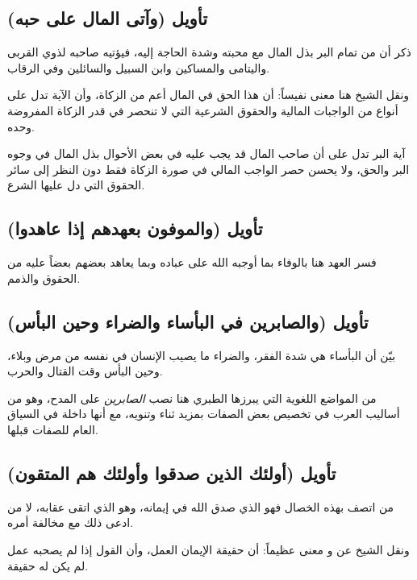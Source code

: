 \subsection{تأويل (وآتى المال على حبه)}
ذكر  أن من تمام البر بذل المال مع محبته وشدة الحاجة إليه، فيؤتيه صاحبه لذوي القربى واليتامى والمساكين وابن السبيل والسائلين وفي الرقاب.

ونقل الشيخ هنا معنى نفيساً: أن هذا الحق في المال أعم من الزكاة، وأن الآية تدل على أنواع من الواجبات المالية والحقوق الشرعية التي لا تنحصر في قدر الزكاة المفروضة وحده.

\begin{fawaid}
آية البر تدل على أن صاحب المال قد يجب عليه في بعض الأحوال بذل المال في وجوه البر والحق، ولا يحسن حصر الواجب المالي في صورة الزكاة فقط دون النظر إلى سائر الحقوق التي دل عليها الشرع.
\end{fawaid}

\subsection{تأويل (والموفون بعهدهم إذا عاهدوا)}
فسر  العهد هنا بالوفاء بما أوجبه الله على عباده وبما يعاهد بعضهم بعضاً عليه من الحقوق والذمم.

\subsection{تأويل (والصابرين في البأساء والضراء وحين البأس)}
بيّن أن البأساء هي شدة الفقر، والضراء ما يصيب الإنسان في نفسه من مرض وبلاء، وحين البأس وقت القتال والحرب.

\begin{fawaid}
من المواضع اللغوية التي يبرزها الطبري هنا نصب \textit{الصابرين} على المدح، وهو من أساليب العرب في تخصيص بعض الصفات بمزيد ثناء وتنويه، مع أنها داخلة في السياق العام للصفات قبلها.
\end{fawaid}

\subsection{تأويل (أولئك الذين صدقوا وأولئك هم المتقون)}
 من اتصف بهذه الخصال فهو الذي صدق الله في إيمانه، وهو الذي اتقى عقابه، لا من ادعى ذلك مع مخالفة أمره.

ونقل الشيخ عن  و معنى عظيماً: أن حقيقة الإيمان العمل، وأن القول إذا لم يصحبه عمل لم يكن له حقيقة.

